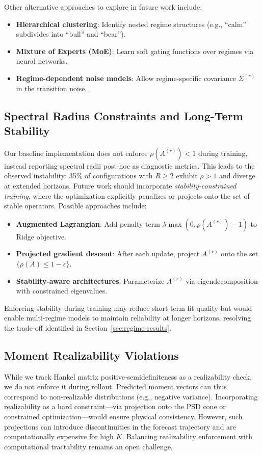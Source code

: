 \documentclass[journal, onecolumn]{IEEEtran}
\begin{document}
Other alternative approaches to explore in future work include:
\begin{itemize}
    \item \textbf{Hierarchical clustering}: Identify nested regime structures (e.g., ``calm'' subdivides into ``bull'' and ``bear'').
    \item \textbf{Mixture of Experts (MoE)}: Learn soft gating functions over regimes via neural networks.
    \item \textbf{Regime-dependent noise models}: Allow regime-specific covariance $\Sigma^{(r)}$ in the transition noise.
\end{itemize}

\subsection{Spectral Radius Constraints and Long-Term Stability}

Our baseline implementation does not enforce $\rho(A^{(r)}) < 1$ during training, instead reporting spectral radii post-hoc as diagnostic metrics. This leads to the observed instability: 35\% of configurations with $R \ge 2$ exhibit $\rho > 1$ and diverge at extended horizons. Future work should incorporate \emph{stability-constrained training}, where the optimization explicitly penalizes or projects onto the set of stable operators. Possible approaches include:
\begin{itemize}
    \item \textbf{Augmented Lagrangian}: Add penalty term $\lambda \max(0, \rho(A^{(r)}) - 1)$ to Ridge objective.
    \item \textbf{Projected gradient descent}: After each update, project $A^{(r)}$ onto the set $\{\rho(A) \le 1 - \epsilon\}$.
    \item \textbf{Stability-aware architectures}: Parameterize $A^{(r)}$ via eigendecomposition with constrained eigenvalues.
\end{itemize}

Enforcing stability during training may reduce short-term fit quality but would enable multi-regime models to maintain reliability at longer horizons, resolving the trade-off identified in Section~\ref{sec:regime-results}.

\subsection{Moment Realizability Violations}

While we track Hankel matrix positive-semidefiniteness as a realizability check, we do not enforce it during rollout. Predicted moment vectors can thus correspond to non-realizable distributions (e.g., negative variance). Incorporating realizability as a hard constraint---via projection onto the PSD cone or constrained optimization---would ensure physical consistency. However, such projections can introduce discontinuities in the forecast trajectory and are computationally expensive for high $K$. Balancing realizability enforcement with computational tractability remains an open challenge.
\end{document}
